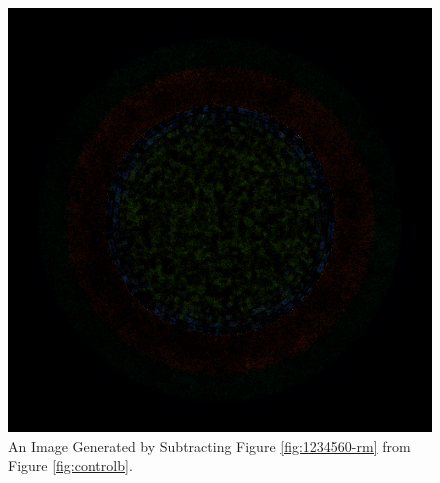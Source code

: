 \begin{figure}[H]
\centering
\includegraphics[width=0.6\linewidth]{figures/shuffle/diff-1234560}
\caption{An Image Generated by Subtracting Figure \ref{fig:1234560-rm} from Figure \ref{fig:controlb}.}
\label{fig:diff-1234560}
\end{figure}